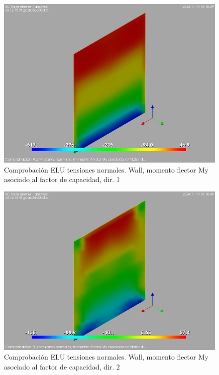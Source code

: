\begin{figure}[ht]
\begin{center}
\includegraphics[width=\linewidth]{results/graphics/normStrsULS/wallMySect1}
\caption{Comprobación ELU tensiones normales. Wall, momento flector My asociado al factor de capacidad, dir. 1}
\label{ULS_normalStressesResistancewallMySect1}
\end{center}
\end{figure}
\begin{figure}[ht]
\begin{center}
\includegraphics[width=\linewidth]{results/graphics/normStrsULS/wallMySect2}
\caption{Comprobación ELU tensiones normales. Wall, momento flector My asociado al factor de capacidad, dir. 2}
\label{ULS_normalStressesResistancewallMySect2}
\end{center}
\end{figure}
